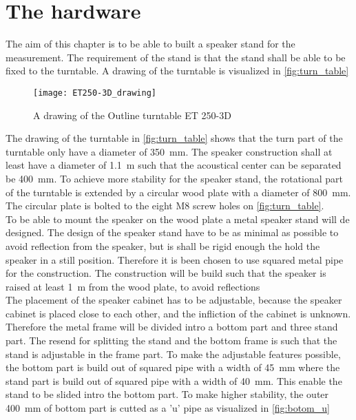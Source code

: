 \section{The hardware}
The aim of this chapter is to be able to built a speaker stand for the measurement. The requirement of the stand is that the stand shall be able to be fixed to the turntable. A drawing of the turntable is visualized in \autoref{fig:turn_table}


 \begin{figure}[H]
	\centering
	\texttt{[image: ET250-3D\_drawing]}
	\caption{A drawing of the Outline turntable ET 250-3D \citep{ET250-3D}}
		\label{fig:turn_table}
\end{figure}



The drawing of the turntable in \autoref{fig:turn_table} shows that the turn part of the turntable only have a diameter of \SI{350}{\milli\meter}. The speaker construction shall at least have a diameter of \SI{1.1}{\meter} such that the acoustical center can be separated be \SI{400}{\milli\meter}. To achieve more stability for the speaker stand, the rotational part of the turntable is extended by a circular wood plate with a diameter of \SI{800}{\milli\meter}. The circular plate is bolted to the eight M8 screw holes on  \autoref{fig:turn_table}. \\
To be able to mount the speaker on the wood plate a metal speaker stand will de designed. The design of the speaker stand have to be as minimal as possible to avoid reflection from the speaker, but is shall be rigid enough the hold the speaker in a still position. Therefore it is been chosen to use squared metal pipe for the construction. The construction will be build such that the speaker is raised at least \SI{1}{\meter} from the wood plate, to avoid reflections\\
The placement of the speaker cabinet has to be adjustable, because the speaker cabinet is placed close to each other, and the infliction of the cabinet is unknown. Therefore the metal frame will be divided intro a bottom part and three stand part. The resend for splitting the stand and the bottom frame is such that the stand is adjustable in the frame part. To make the adjustable features possible, the bottom part is build out of squared pipe with a width of \SI{45}{\milli\meter} where the stand part is build out of squared pipe with a width of \SI{40}{\milli\meter}. This enable the stand to be slided intro the bottom part. To make higher stability, the outer \SI{400}{\milli\meter} of bottom part is cutted as a 'u' pipe as visualized in \autoref{fig:botom_u}

